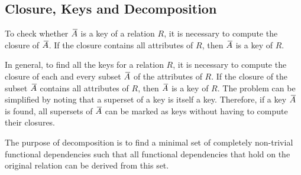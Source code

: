 \subsection{Closure, Keys and Decomposition}

To check whether \( {}\mkern3mu\overline{\mkern-3muA} \) is a key of a relation \( R \), it is necessary to compute the closure of \( {}\mkern3mu\overline{\mkern-3muA} \)\@.
If the closure contains all attributes of \( R \), then \( {}\mkern3mu\overline{\mkern-3muA} \) is a key of \( R \)\@.

In general, to find all the keys for a relation \( R \), it is necessary to compute the closure of each and every subset \( {}\mkern3mu\overline{\mkern-3muA} \) of the attributes of \( R \)\@.
If the closure of the subset \( {}\mkern3mu\overline{\mkern-3muA} \) contains all attributes of \( R \), then \( {}\mkern3mu\overline{\mkern-3muA} \) is a key of \( R \)\@.
The problem can be simplified by noting that a superset of a key is itself a key.
Therefore, if a key \( {}\mkern3mu\overline{\mkern-3muA} \) is found, all supersets of \( {}\mkern3mu\overline{\mkern-3muA} \) can be marked as keys without having to compute their closures.

The purpose of decomposition is to find a minimal set of completely non-trivial functional dependencies such that all functional dependencies that hold on the original relation can be derived from this set.

